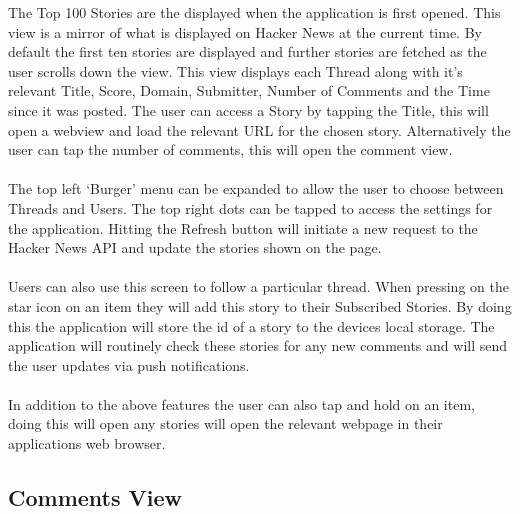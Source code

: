 \documentclass[11pt]{article}
\begin{document}
The Top 100 Stories are the displayed when the application is first opened. This view is a mirror of what is displayed on Hacker News at the current time. By default the first ten stories are displayed and further stories are fetched as the user scrolls down the view. This view displays each Thread along with it's relevant Title, Score, Domain, Submitter, Number of Comments and the Time since it was posted. The user can access a Story by tapping the Title, this will open a webview and load the relevant URL for the chosen story. Alternatively the user can tap the number of comments, this will open the comment view.
\\
\\
The top left ‘Burger' menu can be expanded to allow the user to choose between Threads and Users. The top right dots can be tapped to access the settings for the application. Hitting the Refresh button will initiate a new request to the Hacker News API and update the stories shown on the page.
\\
\\
Users can also use this screen to follow a particular thread. When pressing on the star icon on an item they will add this story to their Subscribed Stories. By doing this the application will store the id of a story to the devices local storage. The application will routinely check these stories for any new comments and will send the user updates via push notifications.
\\
\\
In addition to the above features the user can also tap and hold on an item, doing this will open any stories will open the relevant webpage in their applications web browser.

\subsection*{Comments View}
\end{document}
